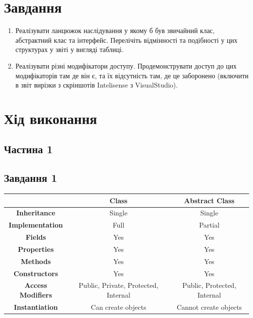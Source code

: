 \documentclass[oneside,14pt]{extarticle}
\begin{document}
\begin{normalsize}
	\section*{Завдання}
	\begin{enumerate}
		\item Реалізувати ланцюжок наслідування у якому б був звичайний клас,
		абстрактний клас та інтерфейс. Перелічіть відмінності та подібності у цих
		структурах у звіті у вигляді таблиці.
		
		\item Реалізувати різні модифікатори доступу. Продемонструвати доступ до цих модифікаторів там де він є, та їх відсутність там, де це заборонено
		(включити в звіт вирізки з скріншотів Intelisense з VisualStudio).
	\end{enumerate}

	\section*{Хід виконання}
	\subsection*{Частина 1}
	\subsection*{Завдання 1}	
	\begin{table}[H]
		\centering
		\begin{tabular}{ |c|c|c| }
			\hline
			& \textbf{Class} & \textbf{Abstract Class} \\ 
			\hline
			\textbf{Inheritance} & Single & Single \\ 
			\hline
			\textbf{Implementation} & Full & Partial \\ 
			\hline
			\textbf{Fields} & Yes & Yes \\ 
			\hline
			\textbf{Properties} & Yes & Yes \\ 
			\hline
			\textbf{Methods} & Yes & Yes \\ 
			\hline
			\textbf{Constructors} & Yes & Yes \\ 
			\hline
			\textbf{Access Modifiers} & Public, Private, Protected, Internal & Public, Protected, Internal \\ 
			\hline
			\textbf{Instantiation} & Can create objects & Cannot create objects \\ 
			\hline
		\end{tabular}
	\end{table}
	

\end{normalsize}
\end{document}
